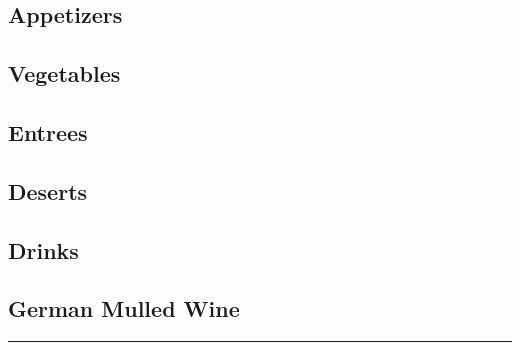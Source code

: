 \documentclass{article}
\begin{document}
\vspace*{\fill}
\begin{center}
\section{Appetizers}
\end{center}
\vspace*{\fill}
\newpage

\vspace*{\fill}
\begin{center}
\section{Vegetables}
\end{center}
\vspace*{\fill}
\newpage

\vspace*{\fill}
\begin{center}
\section{Entrees}
\end{center}
\vspace*{\fill}
\newpage

\vspace*{\fill}
\begin{center}
\section{Deserts}
\end{center}
\vspace*{\fill}
\newpage

\vspace*{\fill}
\begin{center}
\section{Drinks}
\end{center}
\vspace*{\fill}
\newpage

\subsection{German Mulled Wine}
\noindent\rule[0.5ex]{\linewidth}{1pt}
\end{document}
